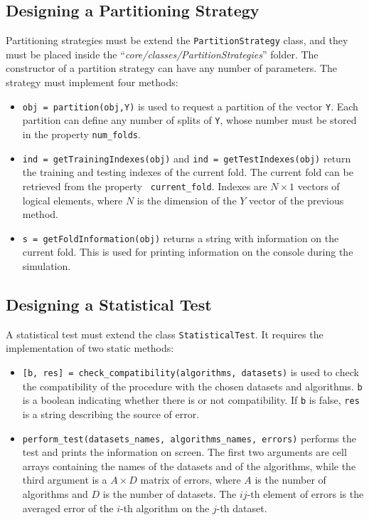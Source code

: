 \subsection{Designing a Partitioning Strategy}

Partitioning strategies must be extend the \verb|PartitionStrategy| class, and they must be placed inside the “\textit{core/classes/PartitionStrategies}” folder. The constructor of a partition strategy can have any number of parameters. The strategy must implement four methods:

\begin{itemize}

\item \verb|obj = partition(obj,Y)| is used to request a partition of the vector \verb|Y|. Each partition can define any number of splits of \verb|Y|, whose number must be stored in the property \verb|num_folds|.
\item \verb|ind = getTrainingIndexes(obj)| and \verb|ind = getTestIndexes(obj)| return the training and testing indexes of the current fold. The current fold can be retrieved from the property \verb| current_fold|. Indexes are $N \times 1$ vectors of logical elements, where $N$ is the dimension of the $Y$ vector of the previous method.
\item \verb|s = getFoldInformation(obj)| returns a string with information on
the current fold. This is used for printing information on the console during the simulation.
\end{itemize}

\subsection{Designing a Statistical Test}

A statistical test must extend the class \verb|StatisticalTest|. It requires the implementation of two static methods:

\begin{itemize}
\item \verb|[b, res] = check_compatibility(algorithms, datasets)| is used
to check the compatibility of the procedure with the chosen datasets
and algorithms. \verb|b| is a boolean indicating whether there is or not
compatibility. If \verb|b| is false, \verb|res| is a string describing the source of error.
\item \verb|perform_test(datasets_names, algorithms_names, errors)| performs
the test and prints the information on screen. The first two arguments are cell arrays containing the names of the datasets and of the algorithms, while the third argument is a $A \times D$ matrix of errors, where $A$ is the number of algorithms and $D$ is the number of datasets. The $ij$-th element of errors is the averaged error of the $i$-th algorithm on the $j$-th dataset.
\end{itemize}